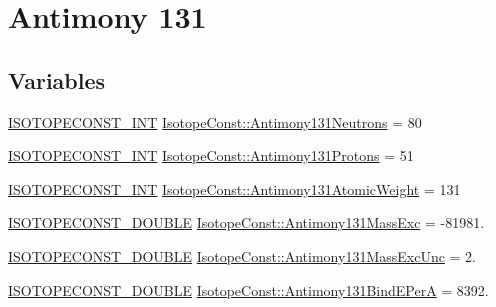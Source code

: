 \hypertarget{group___isotope_const-_antimony-_sb131}{}\section{Antimony 131}
\label{group___isotope_const-_antimony-_sb131}
\subsection*{Variables}
\begin{DoxyCompactItemize}
\item 
\mbox{\hyperlink{group___isotope_const-_macros_ga5f18360b3e99483a35c32d789e62621c}{I\+S\+O\+T\+O\+P\+E\+C\+O\+N\+S\+T\+\_\+\+I\+NT}} \mbox{\hyperlink{group___isotope_const-_antimony-_sb131_gae4877044d8dea22ee361bfdb5e7d80dd}{Isotope\+Const\+::\+Antimony131\+Neutrons}} = 80
\item 
\mbox{\hyperlink{group___isotope_const-_macros_ga5f18360b3e99483a35c32d789e62621c}{I\+S\+O\+T\+O\+P\+E\+C\+O\+N\+S\+T\+\_\+\+I\+NT}} \mbox{\hyperlink{group___isotope_const-_antimony-_sb131_gaabe953a4d5ebc0118af1a71e52475316}{Isotope\+Const\+::\+Antimony131\+Protons}} = 51
\item 
\mbox{\hyperlink{group___isotope_const-_macros_ga5f18360b3e99483a35c32d789e62621c}{I\+S\+O\+T\+O\+P\+E\+C\+O\+N\+S\+T\+\_\+\+I\+NT}} \mbox{\hyperlink{group___isotope_const-_antimony-_sb131_gaf3752e8749d63c7c74a8d305f692adbe}{Isotope\+Const\+::\+Antimony131\+Atomic\+Weight}} = 131
\item 
\mbox{\hyperlink{group___isotope_const-_macros_ga8f45a7272ce02c0b4c65c44636ed719a}{I\+S\+O\+T\+O\+P\+E\+C\+O\+N\+S\+T\+\_\+\+D\+O\+U\+B\+LE}} \mbox{\hyperlink{group___isotope_const-_antimony-_sb131_ga5b1aad9d550a3220682bf4785f72989a}{Isotope\+Const\+::\+Antimony131\+Mass\+Exc}} = -\/81981.
\item 
\mbox{\hyperlink{group___isotope_const-_macros_ga8f45a7272ce02c0b4c65c44636ed719a}{I\+S\+O\+T\+O\+P\+E\+C\+O\+N\+S\+T\+\_\+\+D\+O\+U\+B\+LE}} \mbox{\hyperlink{group___isotope_const-_antimony-_sb131_ga418a88059970a5b181d30a791c6c0d9a}{Isotope\+Const\+::\+Antimony131\+Mass\+Exc\+Unc}} = 2.
\item 
\mbox{\hyperlink{group___isotope_const-_macros_ga8f45a7272ce02c0b4c65c44636ed719a}{I\+S\+O\+T\+O\+P\+E\+C\+O\+N\+S\+T\+\_\+\+D\+O\+U\+B\+LE}} \mbox{\hyperlink{group___isotope_const-_antimony-_sb131_gad18c2ad7785e099964a699017ea5c375}{Isotope\+Const\+::\+Antimony131\+Bind\+E\+PerA}} = 8392.
\item 

\end{DoxyCompactItemize}

